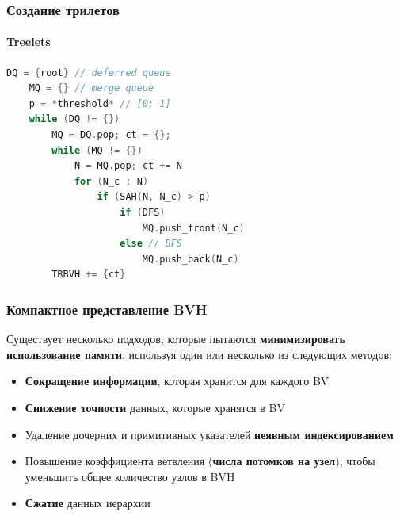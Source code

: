\documentclass{beamer}
\begin{document}
\begin{frame}[fragile]
    \frametitle{Создание трилетов}
    \framesubtitle{Treelets}
    \begin{lstlisting}[language=C++,basicstyle=\ttfamily,keywordstyle=\color{blue}]
    DQ = {root} // deferred queue
    MQ = {} // merge queue
    p = *threshold* // [0; 1]
    while (DQ != {})
        MQ = DQ.pop; ct = {};
        while (MQ != {})
            N = MQ.pop; ct += N
            for (N_c : N)
                if (SAH(N, N_c) > p)
                    if (DFS)
                        MQ.push_front(N_c)
                    else // BFS
                        MQ.push_back(N_c)
        TRBVH += {ct}
    \end{lstlisting}
\end{frame}




\begin{frame}[t]
    \frametitle{Компактное представление BVH}
    Существует несколько подходов, которые пытаются \textbf{минимизировать использование памяти}, используя один или несколько из следующих методов:
    \begin{itemize}
        \item
            \textbf{Сокращение информации}, которая хранится для каждого BV
        \item
            \textbf{Снижение точности} данных, которые хранятся в BV
        \item
            Удаление дочерних и примитивных указателей \textbf{неявным индексированием}
        \item
            Повышение коэффициента ветвления (\textbf{числа потомков на узел}), чтобы уменьшить общее количество узлов в BVH
        \item
            \textbf{Сжатие} данных иерархии
    \end{itemize}
\end{frame}
\end{document}
